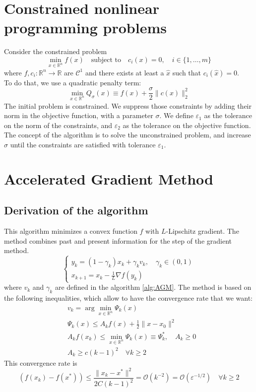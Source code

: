 \documentclass[12pt, openany]{report}
\newcommand{\R}{\mathbb{R}}
\newcommand{\C}{\mathcal{C}}
\renewcommand{\O}{\mathcal{O}}
\theoremstyle{definition}
\begin{document}
\section{Constrained nonlinear programming problems}
Consider the constrained problem 
\begin{equation}
	\min_{x \in \R^n} f(x) \quad \text{subject to} \quad c_i(x) = 0, \quad i \in \{1,\dots,m\}	
\end{equation}
where $f,c_i : \R^n \to \R$ are $\C^1$ and there exists at least a $\hat{x}$ such that $c_i(\hat{x}) = 0$.\\
To do that, we use a quadratic penalty term:
\begin{equation}
	\min_{x \in \R^n} Q_{\sigma} (x) \equiv f(x) + \frac{\sigma}{2} \|c(x)\|_2^2
\end{equation}
The initial problem is constrained. We suppress those constraints by adding their norm in the objective function, with a parameter $\sigma$. We define $\varepsilon_1$ as the tolerance on the norm of the constraints, and $\varepsilon_2$ as the tolerance on the objective function. The concept of the algorithm is to solve the unconstrained problem, and increase $\sigma$ until the constraints are satisfied with tolerance $\varepsilon_1$. 
\section{Accelerated Gradient Method}
\subsection{Derivation of the algorithm}
This algorithm minimizes a convex function $f$ with $L$-Lipschitz gradient. The method combines past and present information for the step of the gradient method. 
\begin{equation}
	\begin{cases}
		y_k = (1-\gamma_k)x_k + \gamma_k v_k, \quad \gamma_k \in (0,1)\\
		x_{k+1} = x_k - \frac{1}{L} \nabla f(y_k)
	\end{cases}
\end{equation}
where $v_k$ and $\gamma_k$ are defined in the algorithm \ref{alg:AGM}. The method is based on the following inequalities, which allow to have the convergence rate that we want:
\begin{equation}
	\begin{aligned}
		&v_k = \arg \min_{x \in \R^n} \Psi_k (x)\\
		&\Psi_k (x) \leq A_k f(x) + \frac{1}{2} \|x-x_0\|^2\\
		&A_k f(x_k) \leq \min_{x \in \R^n} \Psi_k (x) \equiv \Psi_k^*, \quad A_k \geq 0\\
		&A_k \geq c(k-1)^2 \quad \forall k \geq 2
	\end{aligned}
\end{equation}
This convergence rate is 
\begin{equation}
		\left(f(x_k)-f(x^*)\right) \leq \frac{\|x_k-x^*\|^2}{2 C(k-1)^2} = \O(k^{-2}) = \O(\varepsilon^{-1/2}) \quad \forall k \geq 2
\end{equation}
\end{document}
